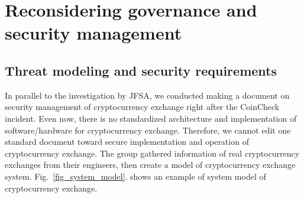 \section{Reconsidering governance and security management}
\subsection{Threat modeling and security requirements}
\setcounter{figure}{2}

In parallel to the investigation by JFSA, we conducted making a document on security management of cryptocurrency exchange right after the CoinCheck incident.
%
Even now, there is no standardized architecture and implementation of software/hardware for cryptocurrency exchange. Therefore, we cannot edit one standard document toward secure implementation and operation of cryptocurrency exchange. The group gathered information of real cryptocurrency exchanges from their engineers, then create a model of cryptocurrency exchange system. Fig.~\ref{fig_system_model}. shows an example of system model of cryptocurrency exchange.

%

